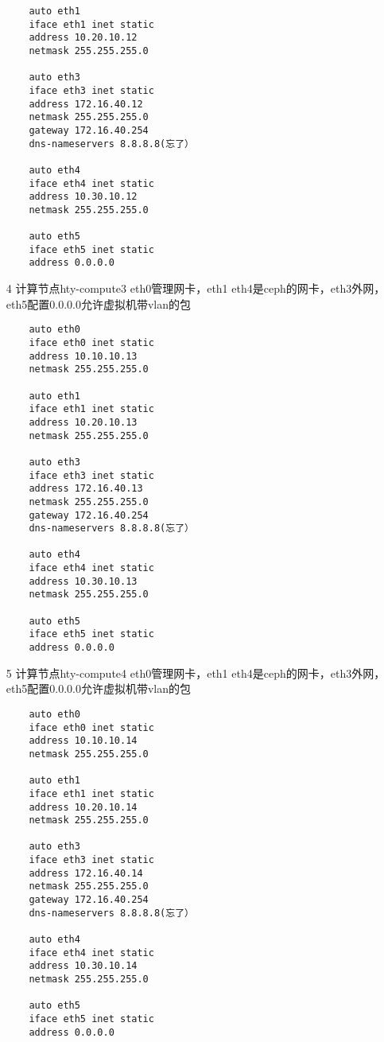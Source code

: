 \documentclass[a4paper,left=1.5cm,right=1.5cm,11pt]{article}
\begin{document}
\begin{itemize}
\begin{lstlisting}
	auto eth1
	iface eth1 inet static
	address 10.20.10.12
	netmask 255.255.255.0

	auto eth3
	iface eth3 inet static
	address 172.16.40.12
	netmask 255.255.255.0
	gateway 172.16.40.254
	dns-nameservers 8.8.8.8(忘了）
	
	auto eth4
	iface eth4 inet static
	address 10.30.10.12
	netmask 255.255.255.0

	auto eth5
	iface eth5 inet static
	address 0.0.0.0
	\end{lstlisting}

	\item[4]计算节点hty-compute3
	eth0管理网卡，eth1 eth4是ceph的网卡，eth3外网，eth5配置0.0.0.0允许虚拟机带vlan的包
	\begin{lstlisting}
	auto eth0
	iface eth0 inet static
	address 10.10.10.13
	netmask 255.255.255.0

	auto eth1
	iface eth1 inet static
	address 10.20.10.13
	netmask 255.255.255.0

	auto eth3
	iface eth3 inet static
	address 172.16.40.13
	netmask 255.255.255.0
	gateway 172.16.40.254
	dns-nameservers 8.8.8.8(忘了）
	
	auto eth4
	iface eth4 inet static
	address 10.30.10.13
	netmask 255.255.255.0

	auto eth5
	iface eth5 inet static
	address 0.0.0.0
	\end{lstlisting}

	\item[5]计算节点hty-compute4
	eth0管理网卡，eth1 eth4是ceph的网卡，eth3外网，eth5配置0.0.0.0允许虚拟机带vlan的包
	\begin{lstlisting}
	auto eth0
	iface eth0 inet static
	address 10.10.10.14
	netmask 255.255.255.0

	auto eth1
	iface eth1 inet static
	address 10.20.10.14
	netmask 255.255.255.0

	auto eth3
	iface eth3 inet static
	address 172.16.40.14
	netmask 255.255.255.0
	gateway 172.16.40.254
	dns-nameservers 8.8.8.8(忘了）
	
	auto eth4
	iface eth4 inet static
	address 10.30.10.14
	netmask 255.255.255.0

	auto eth5
	iface eth5 inet static
	address 0.0.0.0
	\end{lstlisting}

	

\end{itemize}
\end{document}
